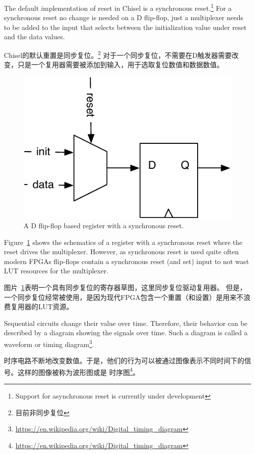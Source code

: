 \documentclass[%
    10pt,
    headinclude, footexclude,
    openright, %
    notitlepage,
    cleardoubleempty,
    headsepline,
    pointlessnumbers,
    bibtotoc, idxtotoc,
    ]{scrbook}
\newcommand{\scale}{0.7}
\newcommand{\myref}[2]{\href{#1}{#2}}
\renewcommand{\myref}[2]{{#2}{\footnote{\url{#1}}}}
\begin{document}
The default implementation of reset in Chisel is a synchronous
reset.\footnote{Support for asynchronous reset is currently under development}
For a synchronous reset no change is needed on a D flip-flop, just a multiplexer
needs to be added to the input that selects between the initialization value under
reset and the data values.

Chisel的默认重置是同步复位。\footnote{目前非同步复位}
对于一个同步复位，不需要在D触发器需要改变，只是一个复用器需要被添加到输入，用于选取复位数值和数据数值。


\begin{figure}
  \centering
  \includegraphics[scale=\scale]{figures/register-reset}
  \caption{A D flip-flop based register with a synchronous reset.}
  \label{fig:register-reset}
\end{figure}

Figure~\ref{fig:register-reset} shows the schematics of a register with a synchronous reset
where the reset drives the multiplexer. However, as synchronous reset is used quite often
modern FPGAs flip-flops contain a synchronous reset (and set) input to not wast LUT
resources for the multiplexer.

图片~\ref{fig:register-reset}表明一个具有同步复位的寄存器草图，这里同步复位驱动复用器。
但是，一个同步复位经常被使用，是因为现代FPGA包含一个重置（和设置）是用来不浪费复用器的LUT资源。

Sequential circuits change their value over time. Therefore, their behavior can be described
by a diagram showing the signals over time. Such a diagram is called a waveform or
\myref{https://en.wikipedia.org/wiki/Digital_timing_diagram}{timing diagram}.

时序电路不断地改变数值。于是，他们的行为可以被通过图像表示不同时间下的信号。这样的图像被称为波形图或是
\myref{https://en.wikipedia.org/wiki/Digital_timing_diagram}{时序图}。
\end{document}
